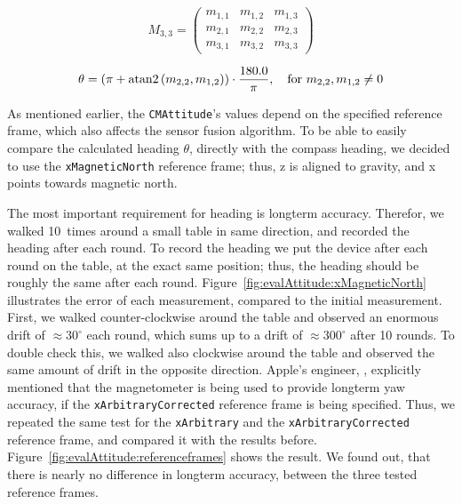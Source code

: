 \begin{equation} \label{eq:rotationmatrix}
  M_{3,3} = \begin{pmatrix}
      m_{1,1} & m_{1,2} & m_{1,3} \\
      m_{2,1} & m_{2,2} & m_{2,3} \\
      m_{3,1} & m_{3,2} & m_{3,3}
  \end{pmatrix}
\end{equation}

\begin{equation} \label{eq:rotation2heading}
  \theta = (\pi + {\rm atan2}\left(m_{2,2} , m_{1,2}\right)) \cdot \frac{180.0}{\pi}, \quad \text{for } m_{2,2}, m_{1,2} \neq 0
\end{equation}

As mentioned earlier, the \texttt{CMAttitude}'s values depend on the specified reference frame, which also affects the sensor fusion algorithm. To be able to easily compare the calculated heading $\theta$, directly with the compass heading, we decided to use the \texttt{xMagneticNorth} reference frame; thus, z is aligned to gravity, and x points towards magnetic north.

The most important requirement for heading is longterm accuracy. Therefor, we walked 10~times around a small table in same direction, and recorded the heading after each round. To record the heading we put the device after each round on the table, at the exact same position; thus, the heading should be roughly the same after each round. Figure~\ref{fig:evalAttitude:xMagneticNorth} illustrates the error of each measurement, compared to the initial measurement. First, we walked counter-clockwise around the table and observed an enormous drift of $\approx 30^{\circ}$ each round, which sums up to a drift of $\approx 300^{\circ}$ after 10 rounds. To double check this, we walked also clockwise around the table and observed the same amount of drift in the opposite direction. Apple's engineer, \citet{apple:wwdc_2012_pham}, explicitly mentioned that the magnetometer is being used to provide longterm yaw accuracy, if the \texttt{xArbitraryCorrected} reference frame is being specified. Thus, we repeated the same test for the \texttt{xArbitrary} and the \texttt{xArbitraryCorrected} reference frame, and compared it with the results before. Figure~\ref{fig:evalAttitude:referenceframes} shows the result. We found out, that there is nearly no difference in longterm accuracy, between the three tested reference frames.


